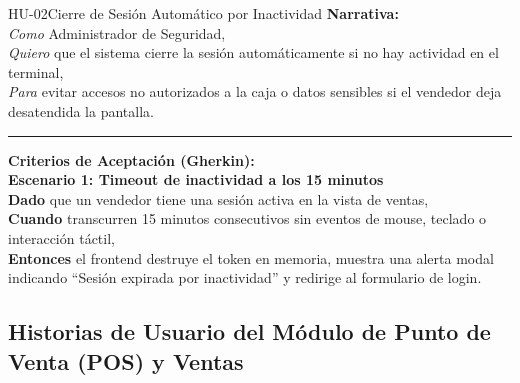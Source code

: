 \begin{hubox}{HU-02}{Cierre de Sesión Automático por Inactividad}
\textbf{Narrativa:}\\
\textit{Como} Administrador de Seguridad,\\
\textit{Quiero} que el sistema cierre la sesión automáticamente si no hay actividad en el terminal,\\
\textit{Para} evitar accesos no autorizados a la caja o datos sensibles si el vendedor deja desatendida la pantalla.

\vspace{0.25cm}\hrule\vspace{0.25cm}
\textbf{Criterios de Aceptación (Gherkin):}\\
\textbf{Escenario 1: Timeout de inactividad a los 15 minutos}\\
\textbf{Dado} que un vendedor tiene una sesión activa en la vista de ventas,\\
\textbf{Cuando} transcurren 15 minutos consecutivos sin eventos de mouse, teclado o interacción táctil,\\
\textbf{Entonces} el frontend destruye el token en memoria, muestra una alerta modal indicando ``Sesión expirada por inactividad'' y redirige al formulario de login.
\end{hubox}

\subsection{Historias de Usuario del Módulo de Punto de Venta (POS) y Ventas}

